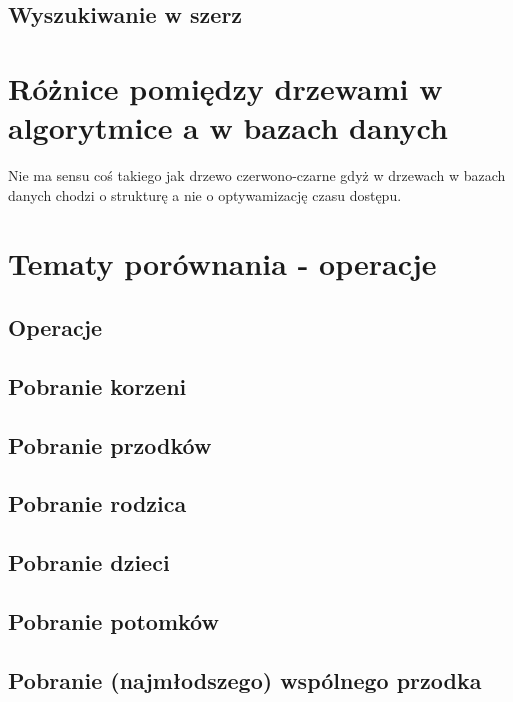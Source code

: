 \documentclass[12pt,a4paper,intlimits,oneside]{report}
\begin{document}
\subsection{Wyszukiwanie w szerz}


\section{Różnice pomiędzy drzewami w algorytmice a w bazach danych}

Nie ma sensu coś takiego jak drzewo czerwono-czarne gdyż w drzewach w bazach danych chodzi o strukturę a nie o optywamizację czasu dostępu.

\section{Tematy porównania - operacje}



\subsection{Operacje}
\subsection{Pobranie korzeni}
\subsection{Pobranie przodków}
\subsection{Pobranie rodzica}
\subsection{Pobranie dzieci}
\subsection{Pobranie potomków}
\subsection{Pobranie (najmłodszego) wspólnego przodka}



\end{document}
